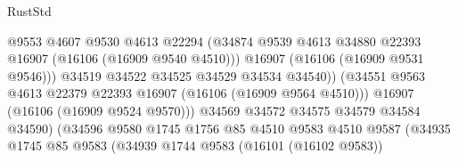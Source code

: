 \begin{lexlean}{RustStd}
\begin{coremodule}
                                              @9553
                                              @4607
                                              @9530
                                              @4613
                                              @22294
                                              (@34874
                                                @9539
                                                @4613
                                                @34880
                                                @22393
                                                @16907
                                                (@16106 (@16909 @9540 @4510)))
                                              @16907
                                              (@16106 (@16909 @9531 @9546)))
                                            @34519
                                            @34522
                                            @34525
                                            @34529
                                            @34534
                                            @34540))
                                        (@34551
                                          @9563
                                          @4613
                                          @22379
                                          @22393
                                          @16907
                                          (@16106 (@16909 @9564 @4510)))
                                        @16907
                                        (@16106 (@16909 @9524 @9570)))
                                      @34569
                                      @34572
                                      @34575
                                      @34579
                                      @34584
                                      @34590)
                                    (@34596
                                      @9580
                                      @1745
                                      @1756
                                      @85
                                      @4510
                                      @9583
                                      @4510
                                      @9587
                                      (@34935
                                        @1745
                                        @85
                                        @9583
                                        (@34939
                                          @1744
                                          @9583
                                          (@16101 (@16102 @9583))

\end{coremodule}
\end{lexlean}
